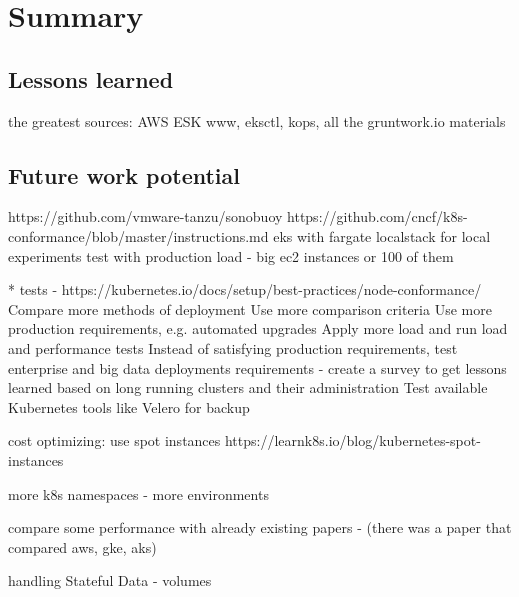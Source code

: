 \section{Summary}
\subsection{Lessons learned}

the greatest sources: AWS ESK www, eksctl, kops, all the gruntwork.io materials

\subsection{Future work potential}
https://github.com/vmware-tanzu/sonobuoy
https://github.com/cncf/k8s-conformance/blob/master/instructions.md
eks with fargate
localstack for local experiments
test with production load - big ec2 instances or 100 of them

* tests - https://kubernetes.io/docs/setup/best-practices/node-conformance/
Compare more methods of deployment
Use more comparison criteria
Use more production requirements, e.g. automated upgrades
Apply more load and run load and performance tests
Instead of satisfying production requirements, test enterprise and big data deployments requirements - create a survey to get lessons learned based on long running clusters and their administration
Test available Kubernetes tools like Velero for backup

cost optimizing: use spot instances https://learnk8s.io/blog/kubernetes-spot-instances

more k8s namespaces - more environments

compare some performance with already existing papers - (there was a paper that compared aws, gke, aks)

handling Stateful Data - volumes
